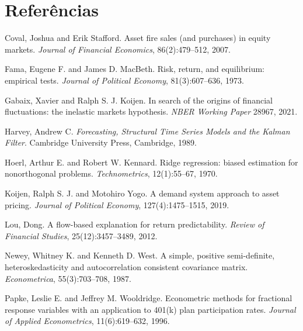 \documentclass[12pt,a4paper]{article}
\begin{document}
\section*{Referências}
\small
\begin{description}
\item Coval, Joshua and Erik Stafford. Asset fire sales (and purchases) in equity markets.
\emph{Journal of Financial Economics}, 86(2):479--512, 2007.
\item Fama, Eugene F. and James D. MacBeth. Risk, return, and equilibrium: empirical tests.
\emph{Journal of Political Economy}, 81(3):607--636, 1973.
\item Gabaix, Xavier and Ralph S. J. Koijen. In search of the origins of financial fluctuations:
the inelastic markets hypothesis. \emph{NBER Working Paper} 28967, 2021.
\item Harvey, Andrew C. \emph{Forecasting, Structural Time Series Models and the Kalman Filter}.
Cambridge University Press, Cambridge, 1989.
\item Hoerl, Arthur E. and Robert W. Kennard. Ridge regression: biased estimation for
nonorthogonal problems. \emph{Technometrics}, 12(1):55--67, 1970.
\item Koijen, Ralph S. J. and Motohiro Yogo. A demand system approach to asset pricing.
\emph{Journal of Political Economy}, 127(4):1475--1515, 2019.
\item Lou, Dong. A flow-based explanation for return predictability. \emph{Review of Financial
Studies}, 25(12):3457--3489, 2012.
\item Newey, Whitney K. and Kenneth D. West. A simple, positive semi-definite, heteroskedasticity
and autocorrelation consistent covariance matrix. \emph{Econometrica}, 55(3):703--708, 1987.
\item Papke, Leslie E. and Jeffrey M. Wooldridge. Econometric methods for fractional response
variables with an application to 401(k) plan participation rates. \emph{Journal of Applied
Econometrics}, 11(6):619--632, 1996.
\end{description}
\end{document}

